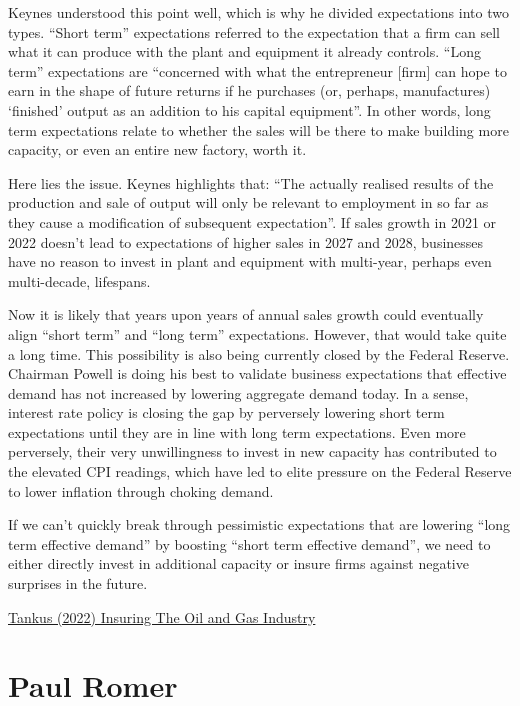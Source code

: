 \documentclass[
]{book}
\begin{document}
Keynes understood this point well, which is why he divided expectations into two types. ``Short term'' expectations referred to the expectation that a firm can sell what it can produce with the plant and equipment it already controls. ``Long term'' expectations are ``concerned with what the entrepreneur {[}firm{]} can hope to earn in the shape of future returns if he purchases (or, perhaps, manufactures) `finished' output as an addition to his capital equipment''. In other words, long term expectations relate to whether the sales will be there to make building more capacity, or even an entire new factory, worth it.

Here lies the issue. Keynes highlights that: ``The actually realised results of the production and sale of output will only be relevant to employment in so far as they cause a modification of subsequent expectation''. If sales growth in 2021 or 2022 doesn't lead to expectations of higher sales in 2027 and 2028, businesses have no reason to invest in plant and equipment with multi-year, perhaps even multi-decade, lifespans.

Now it is likely that years upon years of annual sales growth could eventually align ``short term'' and ``long term'' expectations. However, that would take quite a long time. This possibility is also being currently closed by the Federal Reserve. Chairman Powell is doing his best to validate business expectations that effective demand has not increased by lowering aggregate demand today. In a sense, interest rate policy is closing the gap by perversely lowering short term expectations until they are in line with long term expectations. Even more perversely, their very unwillingness to invest in new capacity has contributed to the elevated CPI readings, which have led to elite pressure on the Federal Reserve to lower inflation through choking demand.

If we can't quickly break through pessimistic expectations that are lowering ``long term effective demand'' by boosting ``short term effective demand'', we need to either directly invest in additional capacity or insure firms against negative surprises in the future.

\href{https://www.crisesnotes.com/is-insuring-the-oil-and-gas-industry-the-right-response-to-the-fallout-from-ukraine/}{Tankus (2022) Insuring The Oil and Gas Industry}

\hypertarget{paul-romer}{%
\section{Paul Romer}\label{paul-romer}}
\end{document}
